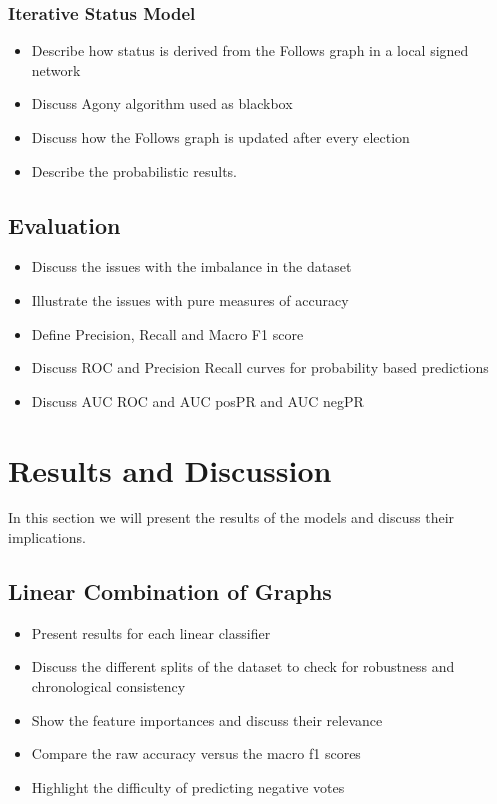     \subsection{Iterative Status Model}
        \begin{itemize} 
            \item Describe how status is derived from the Follows graph in a local signed network 
            \item Discuss Agony algorithm used as blackbox
            \item Discuss how the Follows graph is updated after every election
            \item Describe the probabilistic results.
        \end{itemize}

\section{Evaluation}
\begin{itemize}
    \item Discuss the issues with the imbalance in the dataset
    \item Illustrate the issues with pure measures of accuracy
    \item Define Precision, Recall and Macro F1 score
    \item Discuss ROC and Precision Recall curves for probability based predictions 
    \item Discuss AUC ROC and AUC posPR and AUC negPR
\end{itemize}

\chapter{Results and Discussion} 
\label{chp:results}
In this section we will present the results of the models and discuss their implications.
\section{Linear Combination of Graphs}
\begin{itemize}
    \item Present results for each linear classifier
    \item Discuss the different splits of the dataset to check for robustness and chronological consistency
    \item Show the feature importances and discuss their relevance 
    \item Compare the raw accuracy versus the macro f1 scores
    \item Highlight the difficulty of predicting negative votes
\end{itemize}

